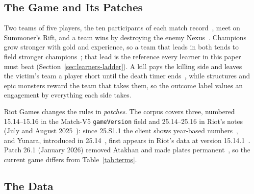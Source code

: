 \subsection{The Game and Its Patches}\label{sec:background-game}

Two teams of five players, the ten participants of each match record~\cite{riotapi2024matchv5}, meet on
Summoner's Rift, and a team wins by destroying the enemy Nexus~\cite{lolwiki2026nexus}. Champions grow stronger with gold and experience, so a team that leads
in both tends to field stronger champions~\cite{lolwiki2026gold,lolwiki2026experience}; that lead is the
reference every learner in this paper must beat (Section~\ref{sec:learners-ladder}). A kill pays the
killing side and leaves the victim's team a player short until the death timer
ends~\cite{lolwiki2026kill,lolwiki2026death}, while structures and epic monsters reward the team that
takes them, so the outcome label values an engagement by everything each side takes.

Riot Games changes the rules in \emph{patches}. The corpus covers three, numbered 15.14--15.16 in the
Match-V5 \texttt{gameVersion} field and 25.14--25.16 in Riot's notes (July and August
2025~\cite{lolwiki2026v2514,lolwiki2026v2516}): since 25.S1.1 the client shows year-based
numbers~\cite{riot2025patch25s11}, and Yunara, introduced in 25.14~\cite{riot2025patch2514}, first
appears in Riot's data at version 15.14.1~\cite{riot2025ddragon1514}. Patch 26.1 (January 2026)
removed Atakhan and made plates permanent~\cite{riot2026patch261}, so the current game differs from
Table~\ref{tab:terms}.

\subsection{The Data}\label{sec:background-data}

